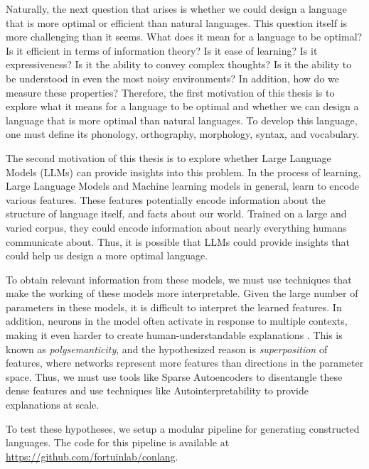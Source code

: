 Naturally, the next question that arises is whether we could design a language that is more optimal or efficient than natural languages.
This question itself is more challenging than it seems. What does it mean for a language to be optimal? Is it efficient in terms of information theory?
Is it ease of learning? Is it expressiveness? Is it the ability to convey complex thoughts? Is it the ability to be understood in even the most 
noisy environments? In addition, how do we measure these properties? Therefore, the first motivation of this thesis is to explore what it means 
for a language to be optimal and whether we can design a language that is more optimal than natural languages. To develop this language, one 
must define its phonology, orthography, morphology, syntax, and vocabulary.

The second motivation of this thesis is to explore whether Large Language Models (LLMs) can provide insights into this problem. In the process 
of learning, Large Language Models and Machine learning models in general, learn to encode various features. These features potentially encode
information about the structure of language itself, and facts about our world. Trained on a large and varied corpus, they could encode information
about nearly everything humans communicate about. Thus, it is possible that LLMs could provide insights that could help us design a more optimal language.

To obtain relevant information from these models, we must use techniques that make the working of these models more interpretable.
Given the large number of parameters in these models, it is difficult to interpret the learned features. In addition, neurons in the model often 
activate in response to multiple contexts, making it even harder to create human-understandable explanations \cite{elhage2022superposition}.  
This is known as \textit{polysemanticity}, and the hypothesized reason is \textit{superposition} of features, where networks represent more features
than directions in the parameter space. Thus, we must use tools like Sparse Autoencoders \cite{cunninghamSparseAutoencodersFind2023} to 
disentangle these dense features and use techniques like Autointerpretability \cite{billsLanguageModelsCan} to provide explanations at scale.




To test these hypotheses, we setup a modular pipeline for generating constructed languages. The code for this pipeline is available at 
\url{https://github.com/fortuinlab/conlang}. 